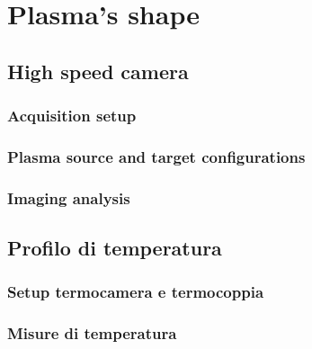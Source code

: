 \chapter{Plasma's shape}
\label{ch:forma}

\section{High speed camera}


\subsection{Acquisition setup}


\subsection{Plasma source and target configurations}


\subsection{Imaging analysis}




\section{Profilo di temperatura}

\subsection{Setup termocamera e termocoppia}

\subsection{Misure di temperatura}
